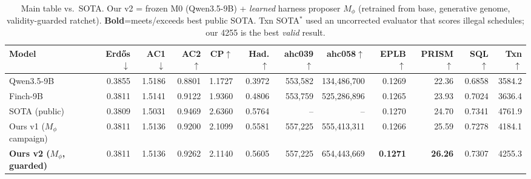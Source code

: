 \begin{table}[t]\centering\small
  \caption{Main table vs.\ SOTA. Our v2 = frozen M0 (Qwen3.5-9B) + \emph{learned} harness proposer $M_\phi$ (retrained from base, generative genome, validity-guarded ratchet). \textbf{Bold}=meets/exceeds best public SOTA. Txn SOTA$^\ast$ used an uncorrected evaluator that scores illegal schedules; our 4255 is the best \emph{valid} result.}
  \label{tab:vs_sota}
  \begin{tabular}{lrrrrrrrrrrr}
    \toprule
    Model & Erd\H{o}s$\downarrow$ & AC1$\downarrow$ & AC2$\uparrow$ & CP$\uparrow$ & Had.$\uparrow$ & ahc039$\uparrow$ & ahc058$\uparrow$ & EPLB$\uparrow$ & PRISM$\uparrow$ & SQL$\uparrow$ & Txn$\uparrow$ \\
    \midrule
    Qwen3.5-9B & 0.3855 & 1.5186 & 0.8801 & 1.1727 & 0.3972 & 553,582 & 134,486,700 & 0.1269 & 22.36 & 0.6858 & 3584.2 \\
    Finch-9B & 0.3811 & 1.5141 & 0.9122 & 1.9360 & 0.4806 & 553,759 & 525,286,896 & 0.1265 & 23.93 & 0.7024 & 3636.4 \\
    SOTA (public) & 0.3809 & 1.5031 & 0.9469 & 2.6360 & 0.5764 & -- & -- & 0.1270 & 24.70 & 0.7341 & 4761.9 \\
    \midrule
    Ours v1 ($M_\phi$ campaign) & 0.3811 & 1.5136 & 0.9200 & 2.1099 & 0.5581 & 557,225 & 555,413,311 & 0.1266 & 25.59 & 0.7278 & 4184.1 \\
    \textbf{Ours v2 ($M_\phi$, guarded)} & 0.3811 & 1.5136 & 0.9262 & 2.1140 & 0.5605 & 557,225 & 654,443,669 & \textbf{0.1271} & \textbf{26.26} & 0.7307 & 4255.3 \\
    \bottomrule
  \end{tabular}
\end{table}
